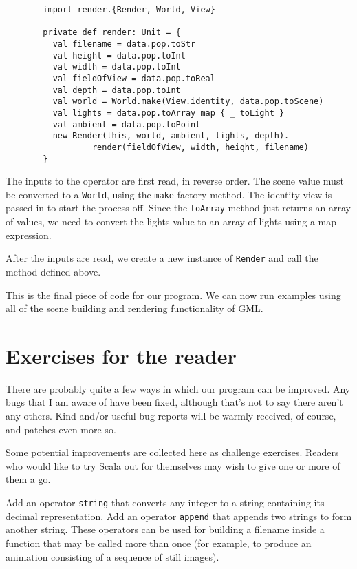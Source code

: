 \begin{figure}
\begin{verbatim}
  import render.{Render, World, View}

  private def render: Unit = {
    val filename = data.pop.toStr
    val height = data.pop.toInt
    val width = data.pop.toInt
    val fieldOfView = data.pop.toReal
    val depth = data.pop.toInt
    val world = World.make(View.identity, data.pop.toScene)
    val lights = data.pop.toArray map { _ toLight }
    val ambient = data.pop.toPoint
    new Render(this, world, ambient, lights, depth).
            render(fieldOfView, width, height, filename)
  }
\end{verbatim}
\getcaption
\end{figure}

The inputs to the operator are first read, in reverse order.
The scene value must be converted to a \verb!World!,
using the \verb!make! factory method.
The identity view is passed in to start the process off.
Since the \verb!toArray! method just returns
an array of values,
we need to convert the lights value to an array of lights
using a map expression.

After the inputs are read,
we create a new instance of \verb!Render!
and call the method defined above.

This is the final piece of code for our program.
We can now run examples using all of the scene building
and rendering functionality of GML.


\section{Exercises\label{sec:exercises} for the reader}

There are probably quite a few ways in which our program can be improved.
Any bugs that I am aware of have been fixed,
although that's not to say there aren't any others.
Kind and/or useful bug reports will be warmly received, of course,
and patches even more so.

Some potential improvements are collected here as challenge exercises.
Readers who would like to try Scala out for themselves
may wish to give one or more of them a go.

\begin{samepage}
\ex
Add an operator \verb!string! that converts any integer
to a string containing its decimal representation.
Add an operator \verb!append! that appends two strings
to form another string.
These operators can be used for building a filename inside a function
that may be called more than once
(for example, to produce an animation
consisting of a sequence of still images).
\end{samepage}

